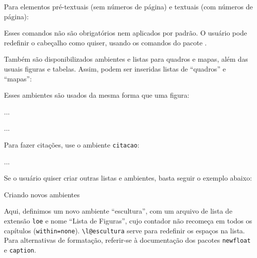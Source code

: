 \documentclass{ltxdoc}
\begin{document}
Para elementos pré-textuais (sem números de página) e textuais (com números de página):

\begin{codigo}{}
\pretextual              \textual
\end{codigo}

Esses comandos não são obrigatórios nem aplicados por padrão. O usuário pode redefinir o cabeçalho como quiser, usando os comandos do pacote .

Também são disponibilizados ambientes e listas para quadros e mapas, além das usuais figuras e tabelas. Assim, podem ser inseridas listas de “quadros” e “mapas”:

\begin{codigo}{}
\listofquadros
\listofmapas
\end{codigo}

 Esses ambientes são usados da mesma forma que uma figura:

\begin{codigo}{}
\begin{quadro} ... \end{quadro}

\begin{mapa} ... \end{mapa}
\end{codigo}

Para fazer citações, use o ambiente \texttt{citacao}:

\begin{codigo}{}
\begin{citacao} ... \end{citacao}
\end{codigo}

Se o usuário quiser criar outras listas e ambientes, basta seguir o exemplo abaixo:

\begin{codigo}{Criando novos ambientes}
\captionsetup[escultura]{listformat=listaescultura}
\makeatletter
\renewcommand*{\l@escultura}{\@dottedtocline{1}{1.5em}{6.5em}}
\makeatother

\end{codigo}

Aqui, definimos um novo ambiente “escultura”, com um arquivo de lista de extensão \texttt{loe} e nome “Lista de Figuras”, cujo contador não recomeça em todos os capítulos (\texttt{within=none}). \verb|\l@escultura| serve para redefinir os espaços na lista. Para alternativas de formatação, referir-se à documentação dos pacotes \texttt{newfloat} e \texttt{caption}. 
\end{document}
